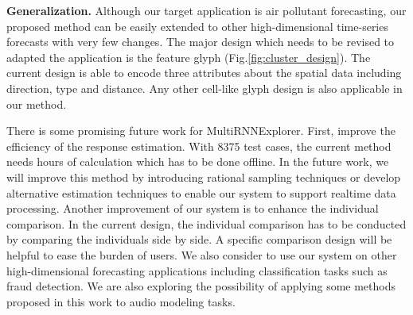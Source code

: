 \textbf{Generalization.}
Although our target application is air pollutant forecasting, our proposed method can be easily extended to other high-dimensional time-series forecasts with very few changes. The major design which needs to be revised to adapted the application is the feature glyph (Fig.\ref{fig:cluster_design}). The current design is able to encode three attributes about the spatial data including direction, type and distance. Any other cell-like glyph design is also applicable in our method. 


There is some promising future work for MultiRNNExplorer. First, improve the efficiency of the response estimation. With 8375 test cases, the current method needs hours of calculation which has to be done offline. 
In the future work, we will improve this method by introducing rational sampling techniques or develop alternative estimation techniques to enable our system to support realtime data processing. Another improvement of our system is to enhance the individual comparison. In the current design, the individual comparison has to be conducted by comparing the individuals side by side. A specific comparison design will be helpful to ease the burden of users. We also consider to use our system on other high-dimensional forecasting applications including classification tasks such as fraud detection\cite{jurgovsky2018sequence}. We are also exploring the possibility of applying some methods proposed in this work to audio modeling tasks. 

